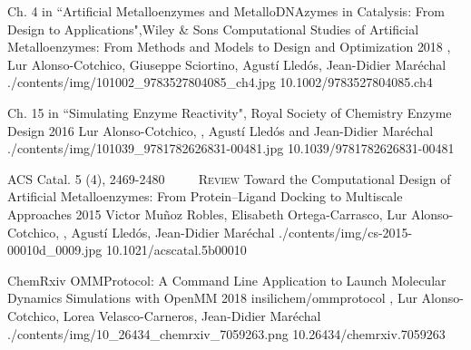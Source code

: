 \begin{cventries}

  \pubentry
    {Ch. 4 in ``Artificial Metalloenzymes and MetalloDNAzymes in Catalysis: From Design to Applications",\newline Wiley \& Sons} %
    {Computational Studies of Artificial Metalloenzymes: From Methods and Models to Design and Optimization} %
    {2018} %
    {} %
    {, Lur Alonso-Cotchico, Giuseppe Sciortino, Agustí Lledós, Jean-Didier Maréchal} %
    {./contents/img/101002_9783527804085_ch4.jpg} %
    {10.1002/9783527804085.ch4} %

    \pubentry
    {Ch. 15 in ``Simulating Enzyme Reactivity", Royal Society of Chemistry} %
    {Enzyme Design} %
    {2016} %
    {} %
    {Lur Alonso-Cotchico, , Agustí Lledós and Jean-Didier Maréchal} %
    {./contents/img/101039_9781782626831-00481.jpg} %
    {10.1039/9781782626831-00481} %

  \pubentry
    {ACS Catal. 5 (4), 2469-2480 ~~\cdot~~ \scshape{Review}} %
    {Toward the Computational Design of Artificial Metalloenzymes: From Protein–Ligand Docking to Multiscale Approaches} %
    {2015} %
    {} %
    {Victor Muñoz Robles, Elisabeth Ortega-Carrasco, Lur Alonso-Cotchico, , Agustí Lledós, Jean-Didier Maréchal} %
    {./contents/img/cs-2015-00010d_0009.jpg} %
    {10.1021/acscatal.5b00010} %

\end{cventries}

\begin{cventries}

  \pubentry
    {ChemRxiv} %
    {OMMProtocol: A Command Line Application to Launch Molecular Dynamics Simulations with OpenMM} %
    {2018} %
    {insilichem/ommprotocol} %
    {,\textsuperscript{\dagger} Lur Alonso-Cotchico, Lorea Velasco-Carneros, Jean-Didier Maréchal\textsuperscript{\dagger}} %
    {./contents/img/10_26434_chemrxiv_7059263.png} %
    {10.26434/chemrxiv.7059263} %

\end{cventries}
